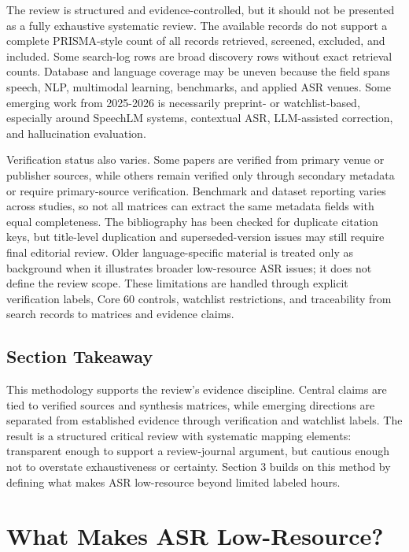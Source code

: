 \documentclass[pdflatex,sn-basic,iicol]{sn-jnl}
\theoremstyle{thmstyleone}
\theoremstyle{thmstyletwo}
\theoremstyle{thmstylethree}
\begin{document}
The review is structured and evidence-controlled, but it should not be presented as a fully exhaustive systematic review. The available records do not support a complete PRISMA-style count of all records retrieved, screened, excluded, and included. Some search-log rows are broad discovery rows without exact retrieval counts. Database and language coverage may be uneven because the field spans speech, NLP, multimodal learning, benchmarks, and applied ASR venues. Some emerging work from 2025-2026 is necessarily preprint- or watchlist-based, especially around SpeechLM systems, contextual ASR, LLM-assisted correction, and hallucination evaluation.

Verification status also varies. Some papers are verified from primary venue or publisher sources, while others remain verified only through secondary metadata or require primary-source verification. Benchmark and dataset reporting varies across studies, so not all matrices can extract the same metadata fields with equal completeness. The bibliography has been checked for duplicate citation keys, but title-level duplication and superseded-version issues may still require final editorial review. Older language-specific material is treated only as background when it illustrates broader low-resource ASR issues; it does not define the review scope. These limitations are handled through explicit verification labels, Core 60 controls, watchlist restrictions, and traceability from search records to matrices and evidence claims.

\subsection{Section Takeaway}

This methodology supports the review's evidence discipline. Central claims are tied to verified sources and synthesis matrices, while emerging directions are separated from established evidence through verification and watchlist labels. The result is a structured critical review with systematic mapping elements: transparent enough to support a review-journal argument, but cautious enough not to overstate exhaustiveness or certainty. Section 3 builds on this method by defining what makes ASR low-resource beyond limited labeled hours.

\section{What Makes ASR Low-Resource?}
\end{document}
